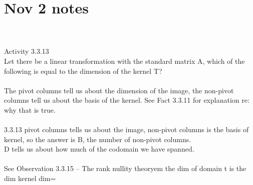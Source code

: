 \documentclass{article}
\begin{document}
\section*{Nov 2 notes}\\
\\
Activity 3.3.13\\
Let there be a linear transformation with the standard matrix A, which of the following is equal to the dimension of the kernel T?\\
\\
The pivot columns tell us about the dimension of the image, the non-pivot columns tell us about the basis of the kernel. See Fact 3.3.11 for explanation re: why that is true. \\
\\
3.3.13 pivot columns tells us about the image, non-pivot columns is the basis of kernel, so the answer is B, the number of non-pivot columns.\\
D tells us about how much of the codomain we have spanned.\\
\\
See Observation 3.3.15 -- The rank nullity theoryem
the dim of domain t is the dim kernel dim=
\end{document}
